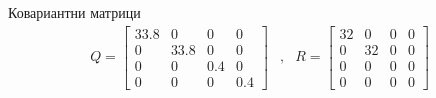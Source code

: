 \documentclass{beamer}
\begin{document}
\begin{frame}{Ковариантни матрици}
	\pause
\begin{align*}
    Q =
    \begin{bmatrix}
        33.8 & 0 & 0 & 0 \\
        0 & 33.8 & 0 & 0 \\
        0 & 0 & 0.4 & 0 \\
        0 & 0 & 0 & 0.4
    \end{bmatrix} &,&
    R = \begin{bmatrix}
        32 & 0 & 0 & 0 \\
        0 & 32 & 0 & 0 \\
        0 & 0 & 0 & 0 \\
        0 & 0 & 0 & 0
    \end{bmatrix}
\end{align*}
\end{frame}
\end{document}
